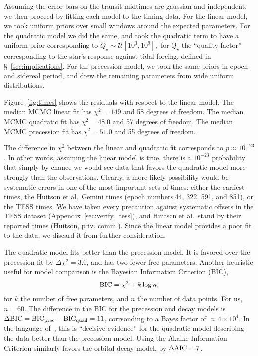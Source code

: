 \documentclass[12pt,twocolumn,tighten]{aastex62}
\begin{document}
Assuming the error bars on the transit midtimes are gaussian and
independent, we then proceed by fitting each model to the timing data.
For the linear model, we took uniform priors over small windows around
the expected parameters.  For the quadratic model we did the same, and
took the quadratic term to have a uniform prior corresponding to
$
  Q_\star \sim \mathcal{U}[10^3, 10^9],
$
for $Q_\star$ the ``quality factor'' corresponding to the star's
response against tidal forcing, defined in \S~\ref{sec:implications}.
For the precession model, we took the same priors in epoch and
sidereal period, and drew the remaining parameters from wide uniform
distributions.

Figure~\ref{fig:times} shows the residuals with respect to the linear
model.
The median MCMC linear fit has $\chi^2 = 149$ and 58 degrees of freedom.
The median MCMC quadratic fit has $\chi^2 = 48.0$ and 57 degrees of freedom.
The median MCMC precession fit has $\chi^2 = 51.0$ and 55 degrees of freedom.


The difference in $\chi^2$ between the linear and quadratic fit
corresponds to $p \approx 10^{-23}$. In other words, assuming the
linear model is true, there is a $10^{-23}$ probability that simply by
chance we would see data that favors the quadratic model more strongly
than the observations.  Clearly, a more likely possibility would be
systematic errors in one of the most important sets of times: either
the earliest times, the Huitson et al.\ Gemini times (epoch numbers
44, 322, 591, and 851), or the TESS times. 
We have taken every precaution against systematic offsets in the
TESS dataset (Appendix~\ref{sec:verify_tess}), and Huitson et al.\ 
stand by their reported times (Huitson, priv. comm.).
Since the linear model provides a poor fit to the data, we discard it
from further consideration.

The quadratic model fits better than the precession model.
It is favored over the precession fit by $\Delta \chi^2 = 3.0$,
and has two fewer free parameters.
Another heuristic useful for model comparison is the Bayesian
Information Criterion (BIC),
\begin{equation}
  {\rm BIC} = \chi^2 + k\log n,
\end{equation}
for $k$ the number of free parameters, and $n$ the number of data
points. For us, $n=60$.
The difference in the BIC for the precession and decay models is
$\Delta {\rm BIC} = {\rm BIC}_{\rm prec} - {\rm BIC}_{\rm quad} = 11$,
corrsonding to a Bayes factor of $\approx 4\times10^{4}$.
In the language of~\citet{kass_bayes_1995}, this is ``decisive
evidence'' for the quadratic model describing the data better than the
precession model.
Using the Akaike Information Criterion similarly favors the orbital
decay model, by $\Delta {\rm AIC} = 7$.
\end{document}
